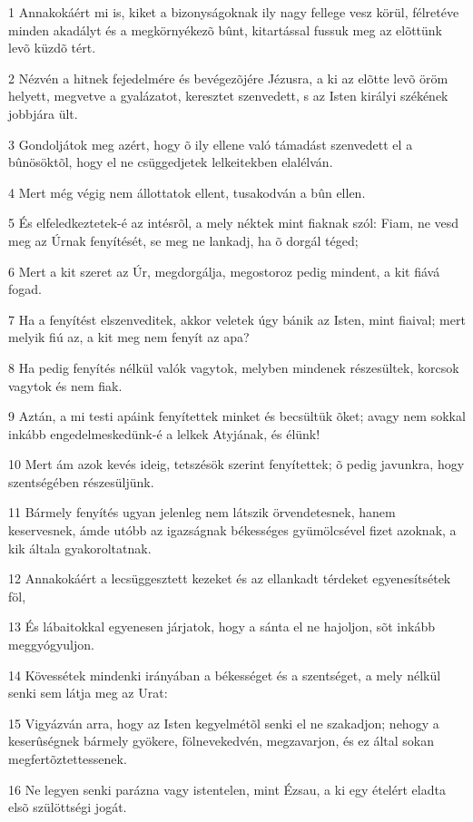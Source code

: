\par 1 Annakokáért mi is, kiket a bizonyságoknak ily nagy fellege vesz körül, félretéve minden akadályt és a megkörnyékezõ bûnt, kitartással fussuk meg az elõttünk levõ küzdõ tért.
\par 2 Nézvén a hitnek fejedelmére és bevégezõjére Jézusra, a ki az elõtte levõ öröm helyett, megvetve a gyalázatot, keresztet szenvedett, s az Isten királyi székének jobbjára ült.
\par 3 Gondoljátok meg azért, hogy õ ily ellene való támadást szenvedett el a bûnösöktõl, hogy el ne csüggedjetek lelkeitekben elalélván.
\par 4 Mert még végig nem állottatok ellent, tusakodván a bûn ellen.
\par 5 És elfeledkeztetek-é az intésrõl, a mely néktek mint fiaknak szól: Fiam, ne vesd meg az Úrnak fenyítését, se meg ne lankadj, ha õ dorgál téged;
\par 6 Mert a kit szeret az Úr, megdorgálja, megostoroz pedig mindent, a kit fiává fogad.
\par 7 Ha a fenyítést elszenveditek, akkor veletek úgy bánik az Isten, mint fiaival; mert melyik fiú az, a kit meg nem fenyít az apa?
\par 8 Ha pedig fenyítés nélkül valók vagytok, melyben mindenek részesültek, korcsok vagytok és nem fiak.
\par 9 Aztán, a mi testi apáink fenyítettek minket és becsültük õket; avagy nem sokkal inkább engedelmeskedünk-é a lelkek Atyjának, és élünk!
\par 10 Mert ám azok kevés ideig, tetszésök szerint fenyítettek; õ pedig javunkra, hogy szentségében részesüljünk.
\par 11 Bármely fenyítés ugyan jelenleg nem látszik örvendetesnek, hanem keservesnek, ámde utóbb az igazságnak békességes gyümölcsével fizet azoknak, a kik általa gyakoroltatnak.
\par 12 Annakokáért a lecsüggesztett kezeket és az ellankadt térdeket egyenesítsétek föl,
\par 13 És lábaitokkal egyenesen járjatok, hogy a sánta el ne hajoljon, sõt inkább meggyógyuljon.
\par 14 Kövessétek mindenki irányában a békességet és a szentséget, a mely nélkül senki sem látja meg az Urat:
\par 15 Vigyázván arra, hogy az Isten kegyelmétõl senki el ne szakadjon; nehogy a keserûségnek bármely gyökere, fölnevekedvén, megzavarjon, és ez által sokan megfertõztettessenek.
\par 16 Ne legyen senki parázna vagy istentelen, mint Ézsau, a ki egy ételért eladta elsõ szülöttségi jogát.
